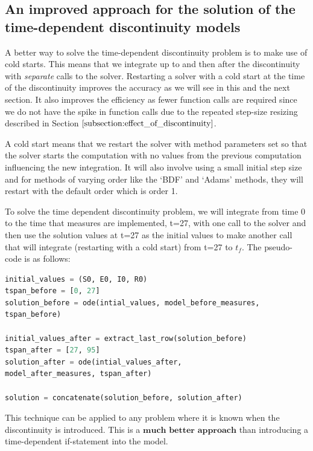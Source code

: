 \subsection{An improved approach for the solution of the time-dependent discontinuity models}
\label{subsection:time_disc_handling}
A better way to solve the time-dependent discontinuity problem is to make use of cold starts. This means that we integrate up to and then after the discontinuity with \emph{separate} calls to the solver. Restarting a solver with a cold start at the time of the discontinuity improves the accuracy as we will see in this and the next section. It also improves the efficiency as fewer function calls are required since we do not have the spike in function calls due to the repeated step-size resizing described in Section $\ref{subsection:effect_of_discontinuity}$.

A cold start means that we restart the solver with method parameters set so that the solver starts the computation with no values from the previous computation influencing the new integration. It will also involve using a small initial step size and for methods of varying order like the `BDF' and `Adams' methods, they will restart with the default order which is order 1.

To solve the time dependent discontinuity problem, we will integrate from time 0 to the time that measures are implemented, t=27, with one call to the solver and then use the solution values at t=27 as the initial values to make another call that will integrate (restarting with a cold start) from t=27 to $t_f$. The pseudo-code is as follows:

\begin{minipage}{\linewidth}
\begin{lstlisting}[language=Python]
initial_values = (S0, E0, I0, R0)
tspan_before = [0, 27]
solution_before = ode(intial_values, model_before_measures,
tspan_before)

initial_values_after = extract_last_row(solution_before)
tspan_after = [27, 95]
solution_after = ode(intial_values_after, 
model_after_measures, tspan_after)

solution = concatenate(solution_before, solution_after)
\end{lstlisting}
\end{minipage}

This technique can be applied to any problem where it is known when the discontinuity is introduced. This is a $\textbf{much better approach}$ than introducing a time-dependent if-statement into the model.

